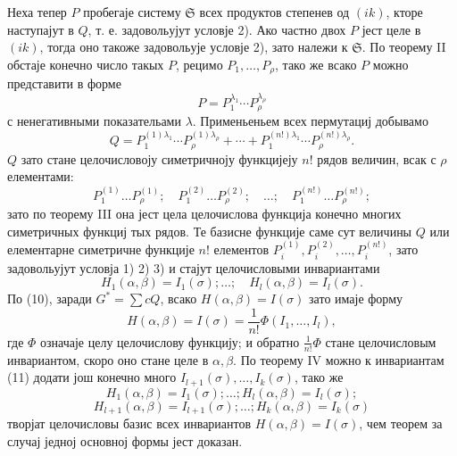 ﻿\documentclass[11pt]{article}
\providecommand{\frS}{\mathfrak S}
\begin{document}
Неха тепер \(P\) пробегаје систему \(\frS\) всех продуктов степенев од \((ik)\), кторе наступајут в \(Q\), т. е. задовольујут условје 2). Ако частно двох \(P\) јест целе в \((ik)\), тогда оно такоже задовольује условје 2), зато належи к \(\frS\). По теорему II обстаје конечно число такых \(P\), рецимо \(P_1,\ldots,P_\rho\), тако же всако \(P\) можно представити в форме
\[
        P=P_1^{\lambda_1}\cdots P_\rho^{\lambda_\rho}
\]
с ненегативными показательами \(\lambda\). Применьеньем всех пермутациј добывамо
\[
        Q=
        P_1^{(1)\lambda_1}\cdots P_\rho^{(1)\lambda_\rho}
        +\cdots+
        P_1^{(n!)\lambda_1}\cdots P_\rho^{(n!)\lambda_\rho}.
\]
\(Q\) зато стане целочисловоју симетричноју функцијеју \(n!\) рядов величин, всак с \(\rho\) елементами:
\[
        P_1^{(1)}\ldots P_\rho^{(1)};
        \quad
        P_1^{(2)}\ldots P_\rho^{(2)};
        \quad \ldots;\quad
        P_1^{(n!)}\ldots P_\rho^{(n!)};
\]
зато по теорему III она јест цела целочислова функција конечно многих симетричных функциј тых рядов. Те базисне функције саме сут величины \(Q\) или елементарне симетричне функције \(n!\) елементов \(P_i^{(1)},P_i^{(2)},\ldots,P_i^{(n!)}\), зато задовольујут условја 1) 2) 3) и стајут целочисловыми инвариантами
\begin{equation}
        H_1(\alpha,\beta)=I_1(\sigma);\ldots;\quad
        H_l(\alpha,\beta)=I_l(\sigma).
\end{equation}
По (10), заради \(G^*=\sum cQ\), всако \(H(\alpha,\beta)=I(\sigma)\) зато имаје форму
\[
        H(\alpha,\beta)=I(\sigma)=\frac1{n!}\Phi(I_1,\ldots,I_l),
\]
где \(\Phi\) означаје целу целочислову функцију; и обратно \(\frac1{n!}\Phi\) стане целочисловым инвариантом, скоро оно стане целе в \(\alpha,\beta\). По теорему IV можно к инвариантам (11) додати још конечно много \(I_{l+1}(\sigma),\ldots,I_k(\sigma)\), тако же
\[
        H_1(\alpha,\beta)=I_1(\sigma);\ldots;H_l(\alpha,\beta)=I_l(\sigma);
\]
\[
        H_{l+1}(\alpha,\beta)=I_{l+1}(\sigma);\ldots;H_k(\alpha,\beta)=I_k(\sigma)
\]
творјат целочисловы базис всех инвариантов \(H(\alpha,\beta)=I(\sigma)\), чем теорем за случај једној основној формы јест доказан.
\end{document}
